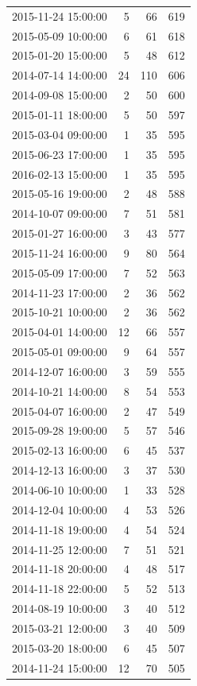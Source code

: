 \begin{tabular}{lrrr}
2015-11-24 15:00:00 & 5 & 66 & 619 \\
2015-05-09 10:00:00 & 6 & 61 & 618 \\
2015-01-20 15:00:00 & 5 & 48 & 612 \\
2014-07-14 14:00:00 & 24 & 110 & 606 \\
2014-09-08 15:00:00 & 2 & 50 & 600 \\
2015-01-11 18:00:00 & 5 & 50 & 597 \\
2015-03-04 09:00:00 & 1 & 35 & 595 \\
2015-06-23 17:00:00 & 1 & 35 & 595 \\
2016-02-13 15:00:00 & 1 & 35 & 595 \\
2015-05-16 19:00:00 & 2 & 48 & 588 \\
2014-10-07 09:00:00 & 7 & 51 & 581 \\
2015-01-27 16:00:00 & 3 & 43 & 577 \\
2015-11-24 16:00:00 & 9 & 80 & 564 \\
2015-05-09 17:00:00 & 7 & 52 & 563 \\
2014-11-23 17:00:00 & 2 & 36 & 562 \\
2015-10-21 10:00:00 & 2 & 36 & 562 \\
2015-04-01 14:00:00 & 12 & 66 & 557 \\
2015-05-01 09:00:00 & 9 & 64 & 557 \\
2014-12-07 16:00:00 & 3 & 59 & 555 \\
2014-10-21 14:00:00 & 8 & 54 & 553 \\
2015-04-07 16:00:00 & 2 & 47 & 549 \\
2015-09-28 19:00:00 & 5 & 57 & 546 \\
2015-02-13 16:00:00 & 6 & 45 & 537 \\
2014-12-13 16:00:00 & 3 & 37 & 530 \\
2014-06-10 10:00:00 & 1 & 33 & 528 \\
2014-12-04 10:00:00 & 4 & 53 & 526 \\
2014-11-18 19:00:00 & 4 & 54 & 524 \\
2014-11-25 12:00:00 & 7 & 51 & 521 \\
2014-11-18 20:00:00 & 4 & 48 & 517 \\
2014-11-18 22:00:00 & 5 & 52 & 513 \\
2014-08-19 10:00:00 & 3 & 40 & 512 \\
2015-03-21 12:00:00 & 3 & 40 & 509 \\
2015-03-20 18:00:00 & 6 & 45 & 507 \\
2014-11-24 15:00:00 & 12 & 70 & 505 \\

\end{tabular}
